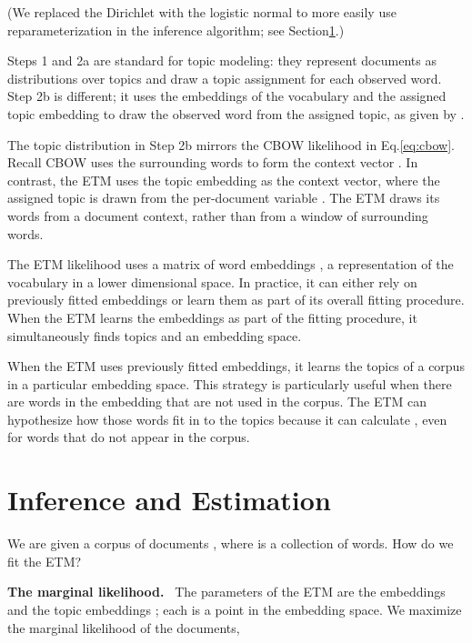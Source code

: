 \documentclass[11pt,a4paper]{article}
\DeclareRobustCommand{\parhead}[1]{\noindent\textbf{#1}~}
\begin{document}
(We replaced the Dirichlet with the logistic normal to more easily use
reparameterization in the inference algorithm; see
Section\nobreakspace \ref {sec:inference}.)

Steps 1 and 2a are standard for topic modeling: they represent
documents as distributions over topics and draw a topic assignment for
each observed word. Step 2b is different; it uses the embeddings of
the vocabulary  and the assigned topic embedding
 to draw the observed word from the assigned topic, as
given by .

The topic distribution in Step 2b mirrors the \gls{CBOW} likelihood in
Eq.\nobreakspace \ref {eq:cbow}. Recall \gls{CBOW} uses the surrounding words to form
the context vector .  In contrast, the \gls{ETM} uses the
topic embedding  as the context vector, where the
assigned topic  is drawn from the per-document variable
.  The \gls{ETM} draws its words from a document context,
rather than from a window of surrounding words.



The \gls{ETM} likelihood uses a matrix of word embeddings , a
representation of the vocabulary in a lower dimensional space.  In
practice, it can either rely on previously fitted embeddings or learn
them as part of its overall fitting procedure.  When the \gls{ETM}
learns the embeddings as part of the fitting procedure, it
simultaneously finds topics and an embedding space.

When the \gls{ETM} uses previously fitted embeddings, it learns the
topics of a corpus in a particular embedding space.  This strategy is
particularly
useful when there are words in the embedding that are not used in the
corpus.  The \gls{ETM} can hypothesize how those words fit in to the
topics because it can calculate , even for words
 that do not appear in the corpus.












 
\section{Inference and Estimation}
\label{sec:inference}

We are given a corpus of documents ,
where  is a collection of  words.  How do we fit the
\gls{ETM}?

\parhead{The marginal likelihood.} The parameters of the \gls{ETM} are
the embeddings  and the topic embeddings
; each  is a point
in the embedding space.  We maximize the marginal likelihood of the
documents,
\end{document}
